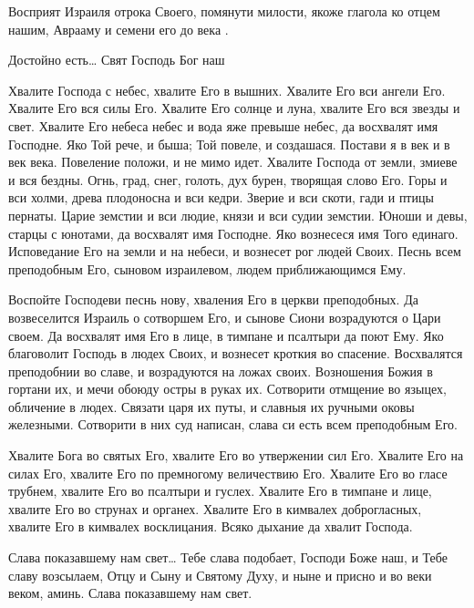 \begin{mymulticols}
Восприят Израиля отрока Своего, помянути милости, якоже глагола ко отцем нашим, Аврааму и семени его до века .


 Достойно есть…  Свят Господь Бог наш 




Хвалите Господа с небес, хвалите Его в вышних. Хвалите Его вси ангели Его. Хвалите Его вся силы Его. Хвалите Его солнце и луна, хвалите Его вся звезды и свет. Хвалите Его небеса небес и вода яже превыше небес, да восхвалят имя Господне. Яко Той рече, и быша; Той повеле, и создашася. Постави я в век и в век века. Повеление положи, и не мимо идет. Хвалите Господа от земли, змиеве и вся бездны. Огнь, град, снег, голоть, дух бурен, творящая слово Его. Горы и вси холми, древа плодоносна и вси кедри. Зверие и вси скоти, гади и птицы пернаты. Царие земстии и вси людие, князи и вси судии земстии. Юноши и девы, старцы с юнотами, да восхвалят имя Господне. Яко вознесеся имя Того единаго. Исповедание Его на земли и на небеси, и вознесет рог людей Своих. Песнь всем преподобным Его, сыновом израилевом, людем приближающимся Ему.




Воспойте Господеви песнь нову, хваления Его в церкви преподобных. Да возвеселится Израиль о сотворшем Его, и сынове Сиони возрадуются о Цари своем. Да восхвалят имя Его в лице, в тимпане и псалтыри да поют Ему. Яко благоволит Господь в людех Своих, и вознесет кроткия во спасение. Восхвалятся преподобнии во славе, и возрадуются на ложах своих. Возношения Божия в гортани их, и мечи обоюду остры в руках их. Сотворити отмщение во языцех, обличение в людех. Связати царя их путы, и славныя их ручными оковы железными. Сотворити в них суд написан, слава си есть всем преподобным Его.




Хвалите Бога во святых Его, хвалите Его во утвержении сил Его. Хвалите Его на силах Его, хвалите Его по премногому величествию Его. Хвалите Его во гласе трубнем, хвалите Его во псалтыри и гуслех. Хвалите Его в тимпане и лице, хвалите Его во струнах и органех. Хвалите Его в кимвалех доброгласных, хвалите Его в кимвалех восклицания. Всяко дыхание да хвалит Господа.


 Слава показавшему нам свет…  Тебе слава подобает, Господи Боже наш, и Тебе славу возсылаем, Отцу и Сыну и Святому Духу, и ныне и присно и во веки веком, аминь. Слава показавшему нам свет. 


\end{mymulticols}
